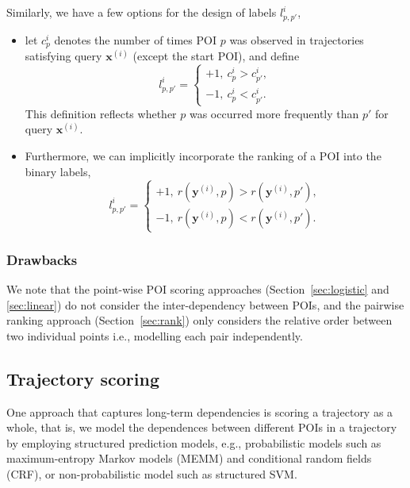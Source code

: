 \documentclass[9pt]{extarticle}
\begin{document}
Similarly, we have a few options for the design of labels $l_{p,p'}^i$,
\begin{itemize}
\item let $c_p^i$ denotes the number of times POI $p$ was observed in trajectories satisfying query $\mathbf{x}^{(i)}$ (except the start POI), and define
      \begin{equation*}
      l_{p,p'}^i = \begin{cases}
      +1,~ c_p^i > c_{p'}^i, \\
      -1,~ c_p^i < c_{p'}^i.
      \end{cases}
      \end{equation*}
      This definition reflects whether $p$ was occurred more frequently than $p'$ for query $\mathbf{x}^{(i)}$.
\item Furthermore, we can implicitly incorporate the ranking of a POI into the binary labels,
      \begin{equation*}
      l_{p,p'}^i = \begin{cases}
      +1,~ r(\mathbf{y}^{(i)}, p) > r(\mathbf{y}^{(i)}, p'), \\
      -1,~ r(\mathbf{y}^{(i)}, p) < r(\mathbf{y}^{(i)}, p').
      \end{cases}
      \end{equation*}
\end{itemize}



\subsubsection{Drawbacks}
\label{sec:drawback}

We note that the point-wise POI scoring approaches (Section~\ref{sec:logistic} and \ref{sec:linear}) do not consider the inter-dependency between POIs,
and the pairwise ranking approach (Section~\ref{sec:rank}) only considers the relative order between two individual points 
i.e., modelling each pair independently.



\subsection{Trajectory scoring}
\label{sec:structured}

One approach that captures long-term dependencies is scoring a trajectory as a whole,
that is, we model the dependences between different POIs in a trajectory by employing structured prediction models,
e.g., probabilistic models such as maximum-entropy Markov models (MEMM) and conditional random fields (CRF),
or non-probabilistic model such as structured SVM.
\end{document}
